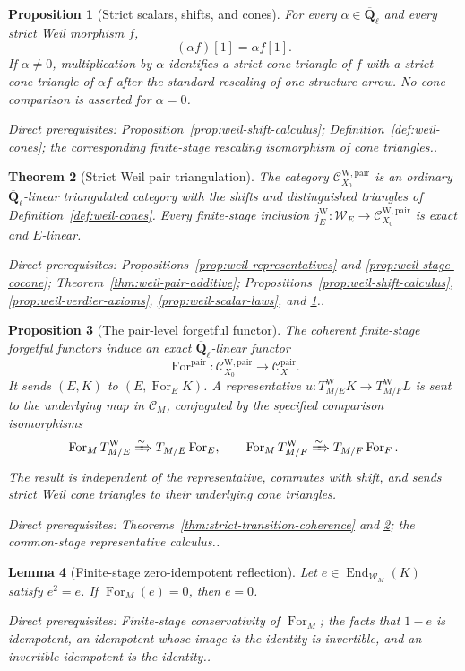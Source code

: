 \documentclass[10pt]{article}
\newtheorem{theorem}{Theorem}[section]
\newtheorem{proposition}[theorem]{Proposition}
\newtheorem{lemma}[theorem]{Lemma}
\theoremstyle{definition}
\newcommand{\Qlb}{\overline{\mathbf Q}_\ell}
\newcommand{\End}{\operatorname{End}}
\newcommand{\Pair}{\mathcal C_X^{\mathrm{pair}}}
\newcommand{\PairW}{\mathcal C_{X_0}^{\mathrm{W,pair}}}
\newcommand{\depends}[1]{\par\smallskip\noindent\textit{Direct prerequisites:} #1.}
\begin{document}
\begin{proposition}[Strict scalars, shifts, and cones]
\label{prop:weil-scalar-triangles}
For every $\alpha\in\Qlb$ and every strict Weil morphism $f$,
\[
 (\alpha f)[1]=\alpha f[1].
\]
If $\alpha\ne0$, multiplication by $\alpha$ identifies a strict cone
triangle of $f$ with a strict cone triangle of $\alpha f$ after the
standard rescaling of one structure arrow.  No cone comparison is asserted
for $\alpha=0$.
\depends{Proposition~\ref{prop:weil-shift-calculus};
Definition~\ref{def:weil-cones}; the corresponding finite-stage rescaling
isomorphism of cone triangles.}
\end{proposition}

\begin{theorem}[Strict Weil pair triangulation]
\label{thm:weil-pair-triangulated}
The category $\PairW$ is an ordinary $\Qlb$-linear triangulated category
with the shifts and distinguished triangles of
Definition~\ref{def:weil-cones}.  Every finite-stage inclusion
$j_E^{\mathrm W}:\mathcal W_E\to\PairW$ is exact and $E$-linear.
\depends{Propositions~\ref{prop:weil-representatives} and
\ref{prop:weil-stage-cocone};
Theorem~\ref{thm:weil-pair-additive}; Propositions~\ref{prop:weil-shift-calculus},
\ref{prop:weil-verdier-axioms}, \ref{prop:weil-scalar-laws}, and
\ref{prop:weil-scalar-triangles}.}
\end{theorem}

\begin{proposition}[The pair-level forgetful functor]
\label{prop:weil-pair-forgetful}
The coherent finite-stage forgetful functors induce an exact
$\Qlb$-linear functor
\[
 \operatorname{For}^{\mathrm{pair}}:\PairW\longrightarrow\Pair.
\]
It sends $(E,K)$ to $(E,\operatorname{For}_E K)$.  A representative
$u:T^{\mathrm W}_{M/E}K\to T^{\mathrm W}_{M/F}L$ is sent to the underlying
map in $\mathcal C_M$, conjugated by the specified comparison isomorphisms
\[
 \operatorname{For}_M T^{\mathrm W}_{M/E}
 \xRightarrow{\sim}T_{M/E}\operatorname{For}_E,
 \qquad
 \operatorname{For}_M T^{\mathrm W}_{M/F}
 \xRightarrow{\sim}T_{M/F}\operatorname{For}_F.
\]
The result is independent of the representative, commutes with shift, and
sends strict Weil cone triangles to their underlying cone triangles.
\depends{Theorems~\ref{thm:strict-transition-coherence} and
\ref{thm:weil-pair-triangulated}; the common-stage representative calculus.}
\end{proposition}

\begin{lemma}[Finite-stage zero-idempotent reflection]
\label{lem:finite-weil-zero-idempotent}
Let $e\in\End_{\mathcal W_M}(K)$ satisfy $e^2=e$.  If
$\operatorname{For}_M(e)=0$, then $e=0$.
\depends{Finite-stage conservativity of $\operatorname{For}_M$; the facts
that $1-e$ is idempotent, an idempotent whose image is the identity is
invertible, and an invertible idempotent is the identity.}
\end{lemma}
\end{document}

